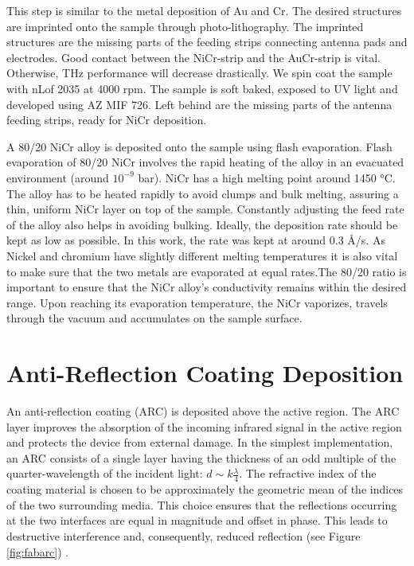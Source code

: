 This step is similar to the metal deposition of Au and Cr. The desired structures are imprinted onto the sample through photo-lithography. The imprinted structures are the missing parts of the feeding strips connecting antenna pads and electrodes. Good contact between the NiCr-strip and the AuCr-strip is vital. Otherwise, THz performance will decrease drastically. We spin coat the sample with nLof 2035 at \num{4000} rpm. The sample is soft baked, exposed to UV light and developed using AZ MIF 726. Left behind are the missing parts of the antenna feeding strips, ready for NiCr deposition.

A \num{80}/\num{20} NiCr alloy is deposited onto the sample using flash evaporation. Flash evaporation of \num{80}/\num{20} NiCr involves the rapid heating of the alloy in an evacuated environment (around $10^{-9}$ \si{\bar}). NiCr has a high melting point around \num{1450} \si{\celsius}. The alloy has to be heated rapidly to avoid clumps and bulk melting, assuring a thin, uniform NiCr layer on top of the sample. Constantly adjusting the feed rate of the alloy also helps in avoiding bulking. Ideally, the deposition rate should be kept as low as possible. In this work, the rate was kept at around \num{0.3} \si{\angstrom}/\si{\s}. As Nickel and chromium have slightly different melting temperatures it is also vital to make sure that the two metals are evaporated at equal rates.The 80/20 ratio is important to ensure that the NiCr alloy’s conductivity remains within the desired range. Upon reaching its evaporation temperature, the NiCr vaporizes, travels through the vacuum and accumulates on the sample surface.

\section{Anti-Reflection Coating Deposition}

An anti-reflection coating (ARC) is deposited above the active region. The ARC layer improves the absorption of the incoming infrared signal in the active region  \cite{chenAntireflectionImplementationsTerahertz2014} and protects the device from external damage. In the simplest implementation, an ARC consists of a single layer having the thickness of an odd multiple of the quarter-wavelength of the incident light: $d \sim k \frac{\lambda}{4}$. The refractive index of the coating material is chosen to be approximately the geometric mean of the indices of the two surrounding media. This choice ensures that the reflections occurring at the two interfaces are equal in magnitude and offset in phase. This leads to destructive interference and, consequently, reduced reflection (see Figure \ref{fig:fabarc}) \cite{paschottaAntireflectionCoatings2005}. 

